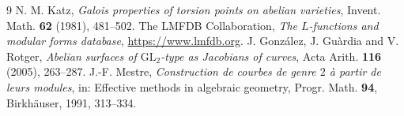 \documentclass[11pt,reqno]{amsart}
\theoremstyle{plain}
\theoremstyle{definition}
\begin{document}
\begin{thebibliography}{9}
 N. M. Katz, \emph{Galois properties of torsion points on abelian varieties},
Invent. Math. \textbf{62} (1981), 481--502.
 The LMFDB Collaboration, \emph{The $L$-functions and modular forms database},
\url{https://www.lmfdb.org}.
 J. Gonz\'alez, J. Gu\`ardia and V. Rotger, \emph{Abelian surfaces of
$\mathrm{GL}_2$-type as Jacobians of curves}, Acta Arith. \textbf{116} (2005), 263--287.
 J.-F. Mestre, \emph{Construction de courbes de genre $2$ \`a partir de leurs
modules}, in: Effective methods in algebraic geometry, Progr. Math. \textbf{94}, Birkh\"auser,
1991, 313--334.
\end{thebibliography}
\end{document}

